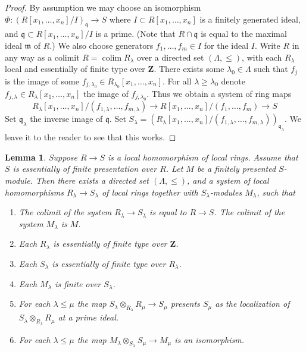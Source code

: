 \documentclass{amsart}
\theoremstyle{plain}
\newtheorem{lemma}[subsection]{Lemma}
\theoremstyle{definition}
\theoremstyle{remark}
\numberwithin{equation}{subsection}
\def\colim{\mathop{\mathrm{colim}}\nolimits}
\begin{document}
\begin{proof}
By assumption we may choose an isomorphism
$\Phi : (R[x_1, \ldots, x_n]/I)_{\mathfrak q} \to S$
where $I \subset R[x_1, \ldots, x_n]$ is a finitely generated ideal,
and $\mathfrak q \subset R[x_1, \ldots, x_n]/I$ is a prime.
(Note that $R \cap \mathfrak q$
is equal to the maximal ideal $\mathfrak m$ of $R$.)
We also choose generators $f_1, \ldots, f_m \in I$ for the ideal $I$.
Write $R$ in any way as a colimit $R = \colim R_\lambda$
over a directed set $(\Lambda, \leq )$, with each $R_\lambda$
local and essentially of finite type over $\mathbf{Z}$.
There exists some $\lambda_0 \in \Lambda$ such that $f_j$ is the image
of some $f_{j, \lambda_0} \in R_{\lambda_0}[x_1, \ldots, x_n]$.
For all $\lambda \geq \lambda_0$ denote
$f_{j, \lambda} \in R_{\lambda}[x_1, \ldots, x_n]$ the image
of $f_{j, \lambda_0}$. Thus we obtain a system of ring maps
$$
R_\lambda[x_1, \ldots, x_n]/(f_{1, \lambda}, \ldots, f_{m, \lambda})
\to
R[x_1, \ldots, x_n]/(f_1, \ldots, f_m) \to S
$$
Set $\mathfrak q_\lambda$ the inverse image of $\mathfrak q$.
Set $S_\lambda = (R_\lambda[x_1, \ldots, x_n]/
(f_{1, \lambda}, \ldots, f_{m, \lambda}))_{\mathfrak q_\lambda}$.
We leave it to the reader to see that this works.
\end{proof}


\begin{lemma}
\label{lemma-limit-module-essentially-finite-presentation}
Suppose $R \to S$ is a local homomorphism of local rings.
Assume that $S$ is essentially of finite presentation over $R$.
Let $M$ be a finitely presented $S$-module.
Then there exists a directed set $(\Lambda, \leq)$, and
a system of local homomorphisms $R_\lambda \to S_\lambda$
of local rings together with $S_\lambda$-modules $M_\lambda$,
such that
\begin{enumerate}
\item The colimit of the system $R_\lambda \to S_\lambda$
is equal to $R \to S$. The colimit of the system $M_\lambda$
is $M$.
\item Each $R_\lambda$ is essentially of finite type
over $\mathbf{Z}$.
\item Each $S_\lambda$ is essentially of finite type
over $R_\lambda$.
\item Each $M_\lambda$ is finite over $S_\lambda$.
\item For each $\lambda \leq \mu$ the map
$S_\lambda \otimes_{R_\lambda} R_\mu \to S_\mu$
presents $S_\mu$ as the localization of
$S_\lambda \otimes_{R_\lambda} R_\mu$
at a prime ideal.
\item For each $\lambda \leq \mu$ the map
$M_\lambda \otimes_{S_\lambda} S_\mu \to M_\mu$
is an isomorphism.
\end{enumerate}
\end{lemma}
\end{document}
